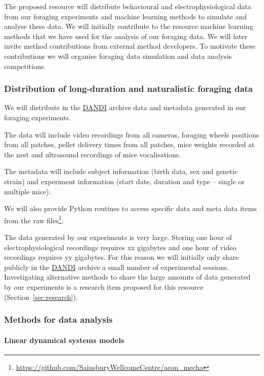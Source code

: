 
The proposed resource will distribute behavioural and electrophysiological data
from our foraging experiments and machine learning methods to simulate and analyse
these data. We will initially contribute to the resource machine learning
methods that we have used for the analysis of our foraging data. We will later
invite method contributions from external method developers. To motivate these
contributions we will organise foraging data simulation and data analysis
competitions.

\subsubsection{Distribution of long-duration and naturalistic foraging data}

We will distribute in the \href{https://dandiarchive.org/}{DANDI} archive data
and metadata generated in our foraging experiments.

The data will include
video recordings from all cameras,
foraging wheels positions from all patches,
pellet delivery times from all patches,
mice weights recorded at the nest and
ultrasound recordings of mice vocalisations.

The metadata will include
subject information (birth data, sex and genetic strain) and
experiment information (start date, duration and type -- single or multiple
mice).

We will also provide Python routines to access specific data and meta data
items from the raw
files\footnote{\url{https://github.com/SainsburyWellcomeCentre/aeon_mecha}}.

The data generated by our experiments is very large. Storing one hour of
electrophysiological recordings requires xx gigabytes and one hour of video
recordings requires yy gigabytes. For this reason we will initially only share
publicly in the \href{https://dandiarchive.org/}{DANDI} archive a small number
of experimental sessions.
%
Investigating alternative methods to share the large amounts of data generated
by our experiments is a research item proposed for this resource
(Section~\ref{sec:research}).

\subsubsection{Methods for data analysis}

\paragraph{Linear dynamical systems models}

